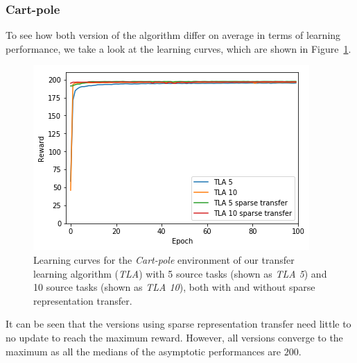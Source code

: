 \subsubsection{Cart-pole} %
\label{ssub:with_sparse_representation_transfer:cartpole}
To see how both version of the algorithm differ on average in terms of learning performance, we take a look at the learning curves, which are shown in Figure~\ref{fig:CartPole:st:reward_target_without-with}.
\begin{figure}[htb]
    \centering
    \includegraphics[width=.8\linewidth]{images/results/CartPole/sparse_transfer/reward_target_without_with.png}
    \caption[Learning curves for the \textit{cart-pole} environment of \textit{TLA} with and without sparse representation transfer]{Learning curves for the \emph{Cart-pole} environment of our transfer learning algorithm (\textit{TLA}) with 5 source tasks (shown as \textit{TLA 5}) and 10 source tasks (shown as \textit{TLA 10}), both with and without sparse representation transfer.}
    \label{fig:CartPole:st:reward_target_without-with}
\end{figure}
It can be seen that the versions using sparse representation transfer need little to no update to reach the maximum reward. However, all versions converge to the maximum as all the medians of the asymptotic performances are $200$.

